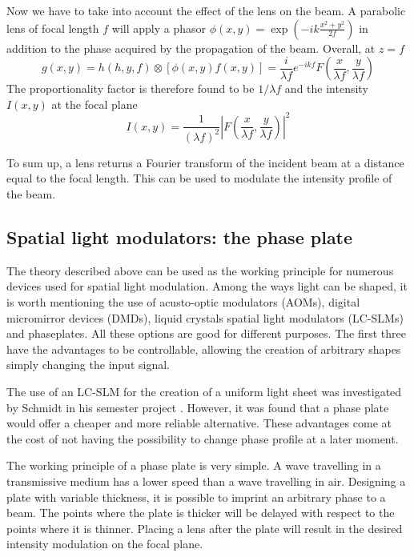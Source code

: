 Now we have to take into account the effect of the lens on the beam. A parabolic lens of focal length $f$ will apply a phasor $\phi(x,y) = \exp(-ik\frac{x^2+y^2}{2f})$ in addition to the phase acquired by the propagation of the beam. Overall, at $z=f$
\begin{equation}
    g(x,y) = h(h,y,f) \otimes \left[ \phi(x,y) f(x,y) \right]
    = \frac{i}{\lambda f} e^{-ikf} F\left(\frac{x}{\lambda f}, \frac{y}{\lambda f}\right)
\end{equation}
The proportionality factor is therefore found to be $1/\lambda f$
and the intensity $I(x,y)$ at the focal plane
\begin{equation}
    I(x,y) = \frac{1}{(\lambda f)^2} \left| F\left(\frac{x}{\lambda f}, \frac{y}{\lambda f}\right) \right|^2
\end{equation}

To sum up, a lens returns a Fourier transform of the incident beam at a distance equal to the focal length. This can be used to modulate the intensity profile of the beam.

\subsection{Spatial light modulators: the phase plate}
The theory described above can be used as the  working principle for numerous devices used for spatial light modulation. Among the ways light can be shaped, it is worth mentioning the use of acusto-optic modulators (AOMs), digital micromirror devices (DMDs), liquid crystals spatial light modulators (LC-SLMs) and phaseplates. All these options are good for different purposes. The first three have the advantages to be controllable, allowing the creation of arbitrary shapes simply changing the input signal.

The use of an LC-SLM for the creation of a uniform light sheet was investigated by Schmidt in his semester project \cite{schmidt2021}. However, it was found that a phase plate would offer a cheaper and more reliable alternative. These advantages come at the cost of not having the possibility to change phase profile at a later moment.

The working principle of a phase plate is very simple. A wave travelling in a transmissive medium has a lower speed than a wave travelling in air. Designing a plate with variable thickness, it is possible to imprint an arbitrary phase to a beam. The points where the plate is thicker will be delayed with respect to the points where it is thinner. Placing a lens after the plate will result in the desired intensity modulation on the focal plane.

